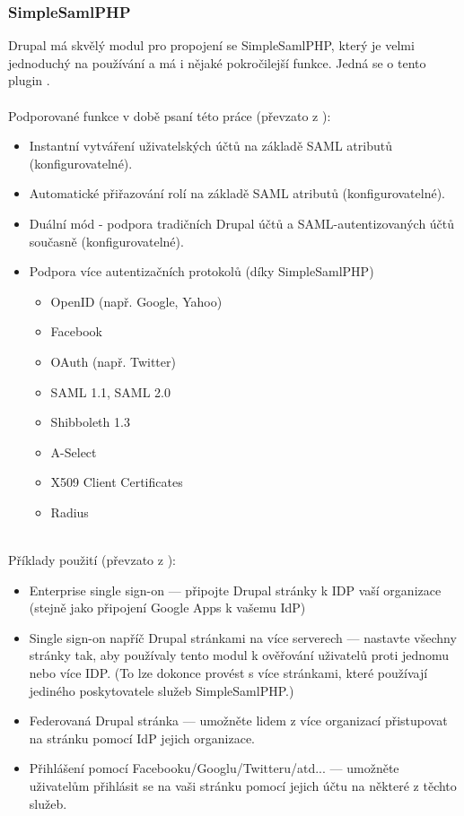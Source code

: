 \subsubsection{SimpleSamlPHP} %
    Drupal má skvělý modul pro propojení se SimpleSamlPHP, který je velmi jednoduchý na používání a má i nějaké pokročilejší funkce. Jedná se o tento plugin \cite{SimpleSAMLphpDrupal}.
\\ 
\\
     Podporované funkce v době psaní této práce (převzato z \cite{SimpleSAMLphpDrupal}):
    \begin{itemize}
        \item Instantní vytváření uživatelských účtů na základě SAML atributů (konfigurovatelné).
        \item Automatické přiřazování rolí na základě SAML atributů (konfigurovatelné).
        \item Duální mód - podpora tradičních Drupal účtů a SAML-autentizovaných účtů současně (konfigurovatelné).
        \item  Podpora více autentizačních protokolů (díky SimpleSamlPHP)
        \begin{itemize}
            \item OpenID (např. Google, Yahoo)
            \item Facebook
            \item OAuth (např. Twitter)
            \item SAML 1.1, SAML 2.0
            \item Shibboleth 1.3
            \item A-Select
            \item X509 Client Certificates
            \item Radius
        \end{itemize}
    \end{itemize}
    \\
    Příklady použití (převzato z \cite{SimpleSAMLphpDrupal}):
    \begin{itemize}
        \item Enterprise single sign-on --- připojte Drupal stránky k IDP vaší organizace (stejně jako připojení Google Apps k vašemu IdP)
        \item Single sign-on napříč Drupal stránkami na více serverech --- nastavte všechny stránky tak, aby používaly tento modul k ověřování uživatelů proti jednomu nebo více IDP. (To lze dokonce provést s více stránkami, které používají jediného poskytovatele služeb SimpleSamlPHP.)
        \item Federovaná Drupal stránka --- umožněte lidem z více organizací přistupovat na stránku pomocí IdP jejich organizace.
        \item Přihlášení pomocí Facebooku/Googlu/Twitteru/atd... --- umožněte uživatelům přihlásit se na vaši stránku pomocí jejich účtu na některé z těchto služeb.
    \end{itemize}
    
